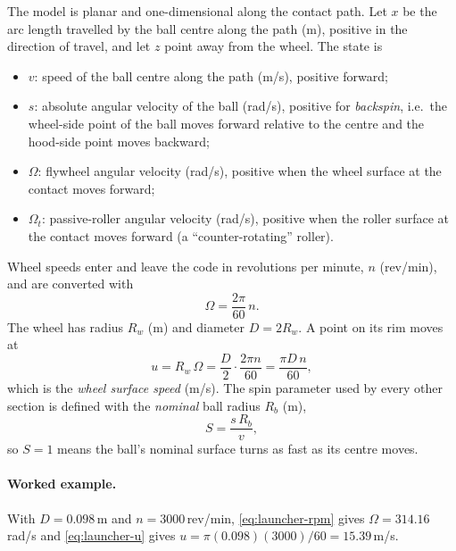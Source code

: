 The model is planar and one-dimensional along the contact path. Let $x$ be the arc length travelled by
the ball centre along the path (\unit{m}), positive in the direction of travel, and let $z$ point away from
the wheel. The state is
\begin{itemize}
  \item $v$: speed of the ball centre along the path (\unit{m/s}), positive forward;
  \item $s$: absolute angular velocity of the ball (\unit{rad/s}), positive for \emph{backspin}, i.e.\ the
        wheel-side point of the ball moves forward relative to the centre and the hood-side point moves
        backward;
  \item $\Omega$: flywheel angular velocity (\unit{rad/s}), positive when the wheel surface at the contact
        moves forward;
  \item $\Omega_t$: passive-roller angular velocity (\unit{rad/s}), positive when the roller surface at the
        contact moves forward (a ``counter-rotating'' roller).
\end{itemize}
Wheel speeds enter and leave the code in revolutions per minute, $n$ (\unit{rev/min}), and are
converted with
\begin{equation}
  \Omega = \frac{2\pi}{60}\,n .
  \label{eq:launcher-rpm}
\end{equation}
The wheel has radius $R_w$ (\unit{m}) and diameter $D = 2R_w$. A point on its rim moves at
\begin{equation}
  u = R_w\,\Omega = \frac{D}{2}\cdot\frac{2\pi n}{60} = \frac{\pi D\, n}{60},
  \label{eq:launcher-u}
\end{equation}
which is the \emph{wheel surface speed} (\unit{m/s}). The spin parameter used by every other section is
defined with the \emph{nominal} ball radius $R_b$ (\unit{m}),
\begin{equation}
  S = \frac{s\,R_b}{v},
  \label{eq:launcher-S}
\end{equation}
so $S=1$ means the ball's nominal surface turns as fast as its centre moves.

\paragraph{Worked example.} With $D = 0.098$\,\unit{m}\userval{} and $n = 3000$\,\unit{rev/min}\assumed,
\eqref{eq:launcher-rpm} gives $\Omega = 314.16$\,\unit{rad/s}\derived{} and \eqref{eq:launcher-u} gives
$u = \pi(0.098)(3000)/60 = 15.39$\,\unit{m/s}\derived.

